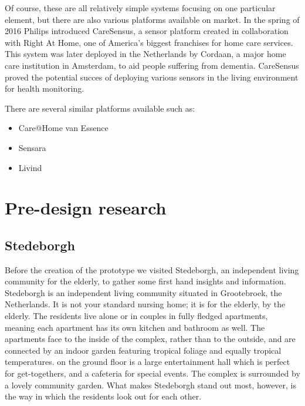 \documentclass{below-ext}
\begin{document}
Of course, these are all relatively simple systems focusing on one particular element, but there are also various platforms available on market. In the spring of 2016 Philips introduced CareSensus, a sensor platform created in collaboration with Right At Home, one of America's biggest franchises for  home care services. This system was later deployed in the Netherlands by Cordaan, a major home care institution in Amsterdam, to aid people suffering from dementia. CareSensus proved the potential succes of deploying various sensors in the living environment for health monitoring.

There are several similar platforms available such as:

\begin{itemize}
\item Care@Home van Essence
\item Sensara
\item Livind
\end{itemize}


\section{Pre-design research}

\subsection{Stedeborgh}

Before the creation of the prototype we visited Stedeborgh, an independent living community for the elderly, to gather some first hand insights and information. Stedeborgh is an independent living community situated in Grootebroek, the Netherlands.  It is not your standard nursing home; it is for the elderly, by the elderly. The residents live alone or in couples in fully fledged apartments, meaning each apartment has its own kitchen and bathroom as well. The apartments face to the inside of the complex, rather than to the outside, and are connected by an indoor garden featuring tropical foliage and equally tropical temperatures. on the ground floor is a large entertainment hall which is perfect for get-togethers, and a cafeteria for special events. The complex is surrounded by a lovely community garden. What makes Stedeborgh stand out most, however, is the way in which the residents look out for each other.
\end{document}
